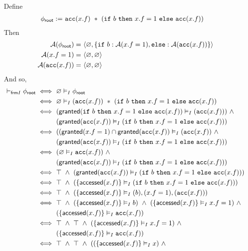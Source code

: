 Define
\begin{align*}
{\phi_\textsf{root}} := & \
\texttt{acc}(x.f) \ \ast \
(\texttt{if} \ b \ \texttt{then} \ x.f = 1 \ \texttt{else} \ \texttt{acc}(x.f))
\end{align*}
Then
\begin{align*}
\mathcal{A}({\phi_\textsf{root}}) = & \
\langle \varnothing, \left\{  \texttt{if} \ b: \mathcal{A}(x.f = 1), \texttt{else}: \mathcal{A}(\texttt{acc}(x.f))  \right\} \rangle \\
\mathcal{A}(x.f = 1) = & \ \langle \varnothing, \varnothing \rangle \\
\mathcal{A}(\texttt{acc}(x.f)) = & \ \langle \varnothing, \varnothing \rangle
\end{align*}
And so,
\begin{align*}
\selfframing \phiroot \iff & \
\empty \frames \phiroot
\\ \iff & \
\empty \frames (\cacc(x.f)) \ \ast \ (\cif \ b \ \cthen \ x.f = 1 \ \celse \ \cacc(x.f))
\\ \iff & \
( \granted(\cif \ b \ \cthen \ x.f = 1 \ \celse \ \cacc(x.f)) \frames (\cacc(x.f)) ) \ \land \\ & \
( \granted(\cacc(x.f)) \frames (\cif \ b \ \cthen \ x.f = 1 \ \celse \ \cacc(x.f)) )
\\ \iff & \
( ( \granted(x.f=1) \cap \granted(\cacc(x.f) ) \frames ( \cacc(x.f) ) \ \land \\ & \
( \granted(\cacc(x.f)) \frames (\cif \ b \ \cthen \ x.f = 1 \ \celse \ \cacc(x.f)) )
\\ \iff & \
( \empty \frames \cacc(x.f) ) \ \land \\ & \
( \granted(\cacc(x.f)) \frames (\cif \ b \ \cthen \ x.f = 1 \ \celse \ \cacc(x.f)) )
\\ \iff & \
\top \ \land \
( \granted(\cacc(x.f)) \frames (\cif \ b \ \cthen \ x.f = 1 \ \celse \ \cacc(x.f)) )
\\ \iff & \
\top \ \land \
( \set{ \accessed(x.f) } \frames (\cif \ b \ \cthen \ x.f = 1 \ \celse \ \cacc(x.f)) )
\\ \iff & \
\top \ \land \
( \set{ \accessed(x.f) } \frames (b), (x.f=1), (\cacc(x.f)) )
\\ \iff & \
\top \ \land \
(\set{ \accessed(x.f) } \frames b) \ \land \
(\set{ \accessed(x.f) } \frames x.f=1) \ \land \\ & \
(\set{ \accessed(x.f) } \frames \cacc(x.f))
\\ \iff & \
\top \ \land \
\top \ \land \
(\set{ \accessed(x.f) } \frames x.f=1) \ \land \\ & \
(\set{ \accessed(x.f) } \frames \cacc(x.f))
\\ \iff & \
\top \ \land \ \top \ \land \
((\set{ \accessed(x.f) } \frames x) \ \land \

\end{align*}
